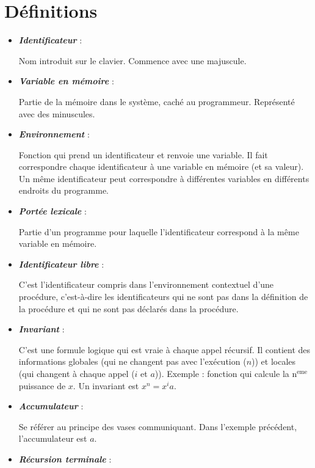 \part{Définitions}

\begin{itemize}
  \item \textbf{\textit{Identificateur}} :

    Nom introduit sur le clavier. Commence avec une majuscule.

  \item \textbf{\textit{Variable en mémoire}} :

    Partie de la mémoire dans le système, caché au programmeur. Représenté avec des minuscules.

  \item \textbf{\textit{Environnement}} :

    Fonction qui prend un identificateur et renvoie une variable. Il fait correspondre chaque identificateur à une variable en mémoire (et sa valeur). Un même identificateur peut correspondre à différentes variables en différents endroits du programme.

  \item \textbf{\textit{Portée lexicale}} :

    Partie d'un programme pour laquelle l'identificateur correspond à la même variable en mémoire.

  \item \textbf{\textit{Identificateur libre}} :

    C'est l'identificateur compris dans l'environnement contextuel d'une procédure, c'est-à-dire les identificateurs qui ne sont pas dans la définition de la procédure et qui ne sont pas déclarés dans la procédure.

  \item \textbf{\textit{Invariant}} :

    C'est une formule logique qui est vraie à chaque appel récursif. Il contient des informations globales (qui ne changent pas avec l'exécution ($n$)) et locales (qui changent à chaque appel ($i$ et $a$)).
    Exemple : fonction qui calcule la n$^{\textrm{eme}}$ puissance de $x$. Un invariant est $x^n = x^ia$.

  \item \textbf{\textit{Accumulateur}} :

    Se référer au principe des vases communiquant. Dans l'exemple précédent, l'accumulateur est $a$.

  \item \textbf{\textit{Récursion terminale}} :


\end{itemize}
